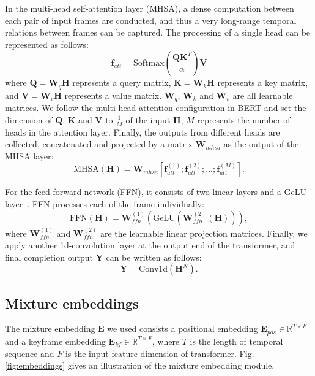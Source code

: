 \documentclass[10pt,twocolumn,letterpaper]{article}
\begin{document}
In the multi-head self-attention layer (MHSA), a dense computation between each pair of input frames are conducted, and thus a very long-range temporal relations between frames can be captured. The processing of a single head can be represented as follows: 
\begin{equation}
\bm{f}_{att} = \text{Softmax}(\frac{\bm{Q}\bm{K}^T}{\alpha})\bm{V}
\end{equation}
where $\bm{Q} = \bm{W}_q\bm{H}$ represents a query matrix, $\bm{K} = \bm{W}_k\bm{H}$ represents a key matrix, and $\bm{V} = \bm{W}_v\bm{H}$ represents a value matrix. $\bm{W}_q$, $\bm{W}_k$ and $\bm{W}_v$ are all learnable matrices. We follow the multi-head attention configuration in BERT and set the dimension of $\bm{Q}$, $\bm{K}$ and $\bm{V}$ to $\frac{1}{M}$ of the input $\bm{H}$, $M$ represents the number of heads in the attention layer. Finally, the outputs from different heads are collected, concatenated and projected by a matrix $\bm{W}_{mhsa}$ as the output of the MHSA layer:
\begin{equation}
\text{MHSA}(\bm{H}) = \bm{W}_{mhsa}[\bm{f}_{att}^{(1)}; \bm{f}_{att}^{(2)}; ...; \bm{f}_{att}^{(M)}].
\end{equation}


For the feed-forward network (FFN), it consists of two linear layers and a GeLU layer~\cite{hendrycks2016gelu}. FFN processes each of the frame individually:
\begin{equation}
\text{FFN}(\bm{H}) = \bm{W}_{ffn}^{(1)}(\text{GeLU}(\bm{W}_{ffn}^{(2)}(\bm{H}))),
\end{equation}
where $\bm{W}_{ffn}^{(1)}$ and $\bm{W}_{ffn}^{(2)}$ are the learnable linear projection matrices.
Finally, we apply another 1d-convolution layer at the output end of the transformer, and final completion output $\bm{Y}$ can be written as follows:
\begin{equation}
\bm{Y} = \text{Conv1d}(\bm{H}^N).
\end{equation}


\subsection{Mixture embeddings}

The mixture embedding $\bm{E}$ we used consists a positional embedding $\bm{E}_{pos} \in \mathbb{R}^{T\times F}$ and a keyframe embedding $\bm{E}_{kf} \in \mathbb{R}^{T\times F}$, where $T$ is the length of temporal sequence and $F$ is the input feature dimension of transformer. Fig.\ref{fig:embeddings} gives an illustration of the mixture embedding module.
\end{document}
